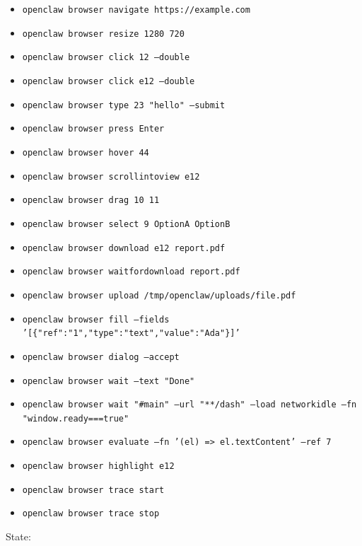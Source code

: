 \begin{itemize}
  \item \texttt{openclaw browser navigate https://example.com}
  \item \texttt{openclaw browser resize 1280 720}
  \item \texttt{openclaw browser click 12 --double}
  \item \texttt{openclaw browser click e12 --double}
  \item \texttt{openclaw browser type 23 "hello" --submit}
  \item \texttt{openclaw browser press Enter}
  \item \texttt{openclaw browser hover 44}
  \item \texttt{openclaw browser scrollintoview e12}
  \item \texttt{openclaw browser drag 10 11}
  \item \texttt{openclaw browser select 9 OptionA OptionB}
  \item \texttt{openclaw browser download e12 report.pdf}
  \item \texttt{openclaw browser waitfordownload report.pdf}
  \item \texttt{openclaw browser upload /tmp/openclaw/uploads/file.pdf}
  \item \texttt{openclaw browser fill --fields '[\{"ref":"1","type":"text","value":"Ada"\}]'}
  \item \texttt{openclaw browser dialog --accept}
  \item \texttt{openclaw browser wait --text "Done"}
  \item \texttt{openclaw browser wait "\#main" --url "**/dash" --load networkidle --fn "window.ready===true"}
  \item \texttt{openclaw browser evaluate --fn '(el) => el.textContent' --ref 7}
  \item \texttt{openclaw browser highlight e12}
  \item \texttt{openclaw browser trace start}
  \item \texttt{openclaw browser trace stop}
\end{itemize}


State:

